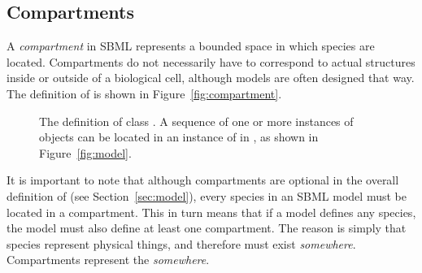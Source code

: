 \subsection{Compartments}
\label{sec:compartments}

A \emph{compartment} in SBML represents a bounded space in which
species are located.  Compartments do not necessarily have to
correspond to actual structures inside or outside of a biological
cell, although models are often designed that way.  The definition
of \Compartment is shown in Figure~\vref{fig:compartment}.

\begin{figure}[htb]
  \centering
  \small
  \caption{The definition of class \Compartment.  A
      sequence of one or more instances of \Compartment objects
      can be located in an instance of \ListOfCompartments in
      \Model, as shown in Figure~\protect\ref{fig:model}.}
  \label{fig:compartment}
\end{figure}

It is important to note that although compartments are optional in
the overall definition of \Model (see Section~\ref{sec:model}),
every species in an SBML model must be located in a compartment.
This in turn means that if a model defines any species, the model
must also define at least one compartment.  The reason is simply
that species represent physical things, and therefore must exist
\emph{somewhere}.  Compartments represent the \emph{somewhere}.


